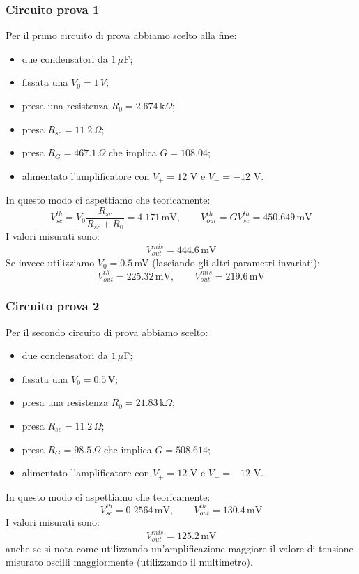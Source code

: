 \documentclass[../main/main.tex]{subfiles}
\begin{document}
\subsubsection{Circuito prova 1}
Per il primo circuito di prova abbiamo scelto alla fine:
\begin{itemize}
\item due condensatori da \( 1 \, \mu  \)F;
\item fissata una \( V_0 = 1\, V \);
\item presa una resistenza \( R_0 = 2.674 \,\text{k}\Omega  \);
\item presa \( R_{sc} = 11.2 \, \Omega  \);
\item presa \( R_G = 467.1 \, \Omega  \) che implica \( G = 108.04 \);
\item alimentato l'amplificatore con \( V_+ = 12 \) V e \( V_- = -12 \) V.
\end{itemize}
In questo modo ci aspettiamo che teoricamente:
\begin{equation*}
  V_{sc}^{th} = V_0 \frac{R_{sc}}{R_{sc}+R_0} = 4.171 \, \text{mV}, \qquad V_{out}^{th} = G V_{sc}^{th} = 450.649 \, \text{mV}
\end{equation*}
I valori misurati sono:
\begin{equation*}
   V_{out}^{mis} =  444.6 \, \text{mV}
\end{equation*}
Se invece utilizziamo \( V_0 = 0.5 \, \)mV (lasciando gli altri parametri invariati):
\begin{equation*}
   V_{out}^{th} =  225.32 \, \text{mV}, \qquad V_{out}^{mis} =  219.6 \, \text{mV}
\end{equation*}

\subsubsection{Circuito prova 2}
Per il secondo circuito di prova abbiamo scelto:
\begin{itemize}
\item due condensatori da \( 1 \, \mu  \)F;
\item fissata una \( V_0 = 0.5 \, \)V;
\item presa una resistenza \( R_0 = 21.83 \,\text{k}\Omega  \);
\item presa \( R_{sc} = 11.2 \, \Omega  \);
\item presa \( R_G = 98.5 \, \Omega  \) che implica \( G = 508.614 \);
\item alimentato l'amplificatore con \( V_+ = 12 \) V e \( V_- = -12 \) V.
\end{itemize}
In questo modo ci aspettiamo che teoricamente:
\begin{equation*}
  V_{sc}^{th} = 0.2564 \, \text{mV}, \qquad V_{out}^{th} = 130.4 \, \text{mV}
\end{equation*}
I valori misurati sono:
\begin{equation*}
   V_{out}^{mis} =  125.2 \, \text{mV}
\end{equation*}
anche se si nota come utilizzando un'amplificazione maggiore il valore di tensione misurato oscilli maggiormente (utilizzando il multimetro).
\end{document}
